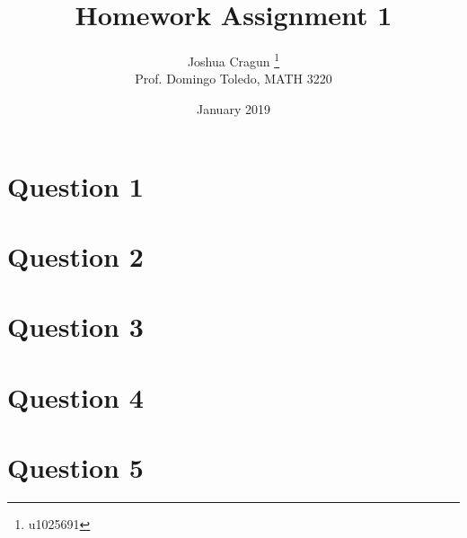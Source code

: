 \documentclass[12pt, letterpaper]{article}
\title{Homework Assignment 1}
\author{Joshua Cragun \thanks{u1025691} \\ Prof. Domingo Toledo, MATH 3220}
\date{January 2019}
\begin{document}
\begin{titlepage}
\maketitle
\end{titlepage}

\section*{Question 1}
\section*{Question 2}
\section*{Question 3}
\section*{Question 4}
\section*{Question 5}
\end{document}
